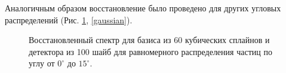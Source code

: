 \documentclass{config}
\begin{document}
Аналогичным образом восстановление было проведено для других угловых распределений (Рис. \ref{uniform}, \ref{gaussian}).

\begin{figure}[h]
\begin{minipage}[h]{0.45\linewidth}
    \caption{Восстановленный спектр для базиса из 60 кубических сплайнов и детектора из 100 шайб для равномерного распределения частиц по углу от $0^\circ$ до $15^\circ$.}
    \label{uniform}
\end{minipage}
\hfill
\begin{minipage}[h]{0.45\linewidth}

\end{minipage}
\end{figure}
\end{document}
